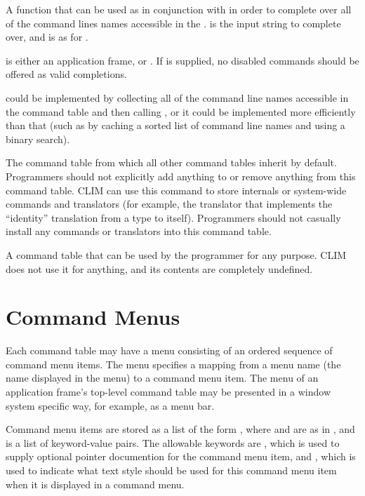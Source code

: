A function that can be used as in conjunction with  in order
to complete over all of the command lines names accessible in the  .   is the input string to complete over,
and  is as for .

 is either an application frame, or .  If  is
supplied, no disabled commands should be offered as valid completions.

 could be implemented by collecting all of the
command line names accessible in the command table and then calling
, or it could be implemented more efficiently
than that (such as by caching a sorted list of command line names and using a
binary search).



The command table from which all other command tables inherit by default.
Programmers should not explicitly add anything to or remove anything from this
command table.  CLIM can use this command to store internals or system-wide
commands and translators (for example, the translator that implements the
``identity'' translation from a type to itself).  Programmers should not
casually install any commands or translators into this command table.


A command table that can be used by the programmer for any purpose.  CLIM does
not use it for anything, and its contents are completely undefined.


\section {Command Menus}

Each command table may have a menu consisting of an ordered sequence of command
menu items.  The menu specifies a mapping from a menu name (the name displayed
in the menu) to a command menu item.  The menu of an application frame's
top-level command table may be presented in a window system specific way, for
example, as a menu bar.

Command menu items are stored as a list of the form
, where  and 
are as in , and  is a list of
keyword-value pairs.  The allowable keywords are , which is
used to supply optional pointer documention for the command menu item, and
, which is used to indicate what text style should be used for
this command menu item when it is displayed in a command menu.

